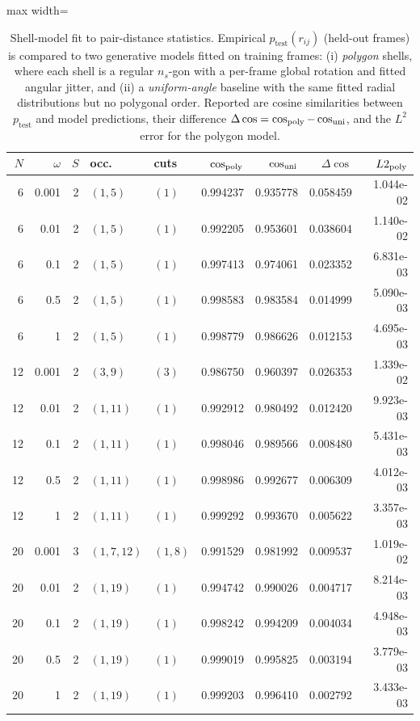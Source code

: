\begin{table}[t]
\centering
\small
\setlength{\tabcolsep}{3.5pt}
\renewcommand{\arraystretch}{1.12}
\begin{adjustbox}{max width=\textwidth}
\begin{tabular}{rrrllrrrr}
\toprule
$N$ & $\omega$ & $S$ & occ. & cuts & $\cos_{\rm poly}$ & $\cos_{\rm uni}$ & $\Delta\cos$ & $L2_{\rm poly}$ \\
\midrule
6 & 0.001 & 2 & $(1,5)$ & $(1)$ & 0.994237 & 0.935778 & 0.058459 & 1.044e-02 \\
6 & 0.01 & 2 & $(1,5)$ & $(1)$ & 0.992205 & 0.953601 & 0.038604 & 1.140e-02 \\
6 & 0.1 & 2 & $(1,5)$ & $(1)$ & 0.997413 & 0.974061 & 0.023352 & 6.831e-03 \\
6 & 0.5 & 2 & $(1,5)$ & $(1)$ & 0.998583 & 0.983584 & 0.014999 & 5.090e-03 \\
6 & 1 & 2 & $(1,5)$ & $(1)$ & 0.998779 & 0.986626 & 0.012153 & 4.695e-03 \\
12 & 0.001 & 2 & $(3,9)$ & $(3)$ & 0.986750 & 0.960397 & 0.026353 & 1.339e-02 \\
12 & 0.01 & 2 & $(1,11)$ & $(1)$ & 0.992912 & 0.980492 & 0.012420 & 9.923e-03 \\
12 & 0.1 & 2 & $(1,11)$ & $(1)$ & 0.998046 & 0.989566 & 0.008480 & 5.431e-03 \\
12 & 0.5 & 2 & $(1,11)$ & $(1)$ & 0.998986 & 0.992677 & 0.006309 & 4.012e-03 \\
12 & 1 & 2 & $(1,11)$ & $(1)$ & 0.999292 & 0.993670 & 0.005622 & 3.357e-03 \\
20 & 0.001 & 3 & $(1,7,12)$ & $(1,8)$ & 0.991529 & 0.981992 & 0.009537 & 1.019e-02 \\
20 & 0.01 & 2 & $(1,19)$ & $(1)$ & 0.994742 & 0.990026 & 0.004717 & 8.214e-03 \\
20 & 0.1 & 2 & $(1,19)$ & $(1)$ & 0.998242 & 0.994209 & 0.004034 & 4.948e-03 \\
20 & 0.5 & 2 & $(1,19)$ & $(1)$ & 0.999019 & 0.995825 & 0.003194 & 3.779e-03 \\
20 & 1 & 2 & $(1,19)$ & $(1)$ & 0.999203 & 0.996410 & 0.002792 & 3.433e-03 \\
\bottomrule
\end{tabular}
\end{adjustbox}
\caption{Shell-model fit to pair-distance statistics. Empirical $p_{\mathrm{test}}(r_{ij})$ (held-out frames) is compared to two generative models fitted on training frames: (i) \emph{polygon} shells, where each shell is a regular $n_s$-gon with a per-frame global rotation and fitted angular jitter, and (ii) a \emph{uniform-angle} baseline with the same fitted radial distributions but no polygonal order. Reported are cosine similarities between $p_{\mathrm{test}}$ and model predictions, their difference $\Delta\cos=\cos_{\rm poly}-\cos_{\rm uni}$, and the $L^2$ error for the polygon model.}
\label{tab:shell_model_fit}
\end{table}
